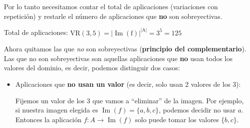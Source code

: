 \documentclass[a4paper,12pt]{article}
\begin{document}
\begin{ejercicio}[title=Ejercicio 20]
\begin{itemize}
    Por lo tanto necesitamos contar el total de aplicaciones (variaciones con repetición) y restarle el número de aplicaciones que \textbf{no} son sobreyectivas.

    Total de aplicaciones: $\operatorname{VR(3,5) = |\operatorname{Im}(f)|^{|A|}} = 3^5 = 125$

    Ahora quitamos las que \emph{no} son sobreyectivas (\textbf{principio del complementario}). Las que no son sobreyectivas son aquellas aplicaciones que \textbf{no} usan todos los valores del dominio, es decir, podemos distinguir dos casos:

\begin{itemize}

    \item Aplicaciones que \textbf{no usan un valor} (es decir, solo usan 2 valores de los 3):  

\vspace{0.5em}

    Fijemos un valor de los 3 que vamos a “eliminar” de la imagen. Por ejemplo, si nuestra imagen elegida es $\operatorname{Im}(f)=\{a,b,c\}$, podemos decidir no usar $a$. Entonces la aplicación $f: A \to \operatorname{Im}(f)$ solo puede tomar los valores $\{b,c\}$.  

    \end{itemize}
    \end{itemize}
    \end{ejercicio}
\end{document}
